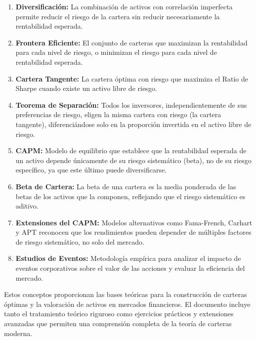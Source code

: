 \begin{enumerate}
\item \textbf{Diversificación:} La combinación de activos con correlación imperfecta permite reducir el riesgo de la cartera sin reducir necesariamente la rentabilidad esperada.

\item \textbf{Frontera Eficiente:} El conjunto de carteras que maximizan la rentabilidad para cada nivel de riesgo, o minimizan el riesgo para cada nivel de rentabilidad esperada.

\item \textbf{Cartera Tangente:} La cartera óptima con riesgo que maximiza el Ratio de Sharpe cuando existe un activo libre de riesgo.

\item \textbf{Teorema de Separación:} Todos los inversores, independientemente de sus preferencias de riesgo, eligen la misma cartera con riesgo (la cartera tangente), diferenciándose solo en la proporción invertida en el activo libre de riesgo.

\item \textbf{CAPM:} Modelo de equilibrio que establece que la rentabilidad esperada de un activo depende únicamente de su riesgo sistemático (beta), no de su riesgo específico, ya que este último puede diversificarse.

\item \textbf{Beta de Cartera:} La beta de una cartera es la media ponderada de las betas de los activos que la componen, reflejando que el riesgo sistemático es aditivo.

\item \textbf{Extensiones del CAPM:} Modelos alternativos como Fama-French, Carhart y APT reconocen que los rendimientos pueden depender de múltiples factores de riesgo sistemático, no solo del mercado.

\item \textbf{Estudios de Eventos:} Metodología empírica para analizar el impacto de eventos corporativos sobre el valor de las acciones y evaluar la eficiencia del mercado.

\end{enumerate}

Estos conceptos proporcionan las bases teóricas para la construcción de carteras óptimas y la valoración de activos en mercados financieros. El documento incluye tanto el tratamiento teórico riguroso como ejercicios prácticos y extensiones avanzadas que permiten una comprensión completa de la teoría de carteras moderna.



